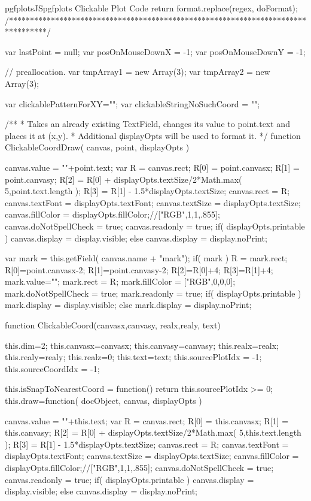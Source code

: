 {{\begin{insDLJS}[processAnnotatedPlot]{pgfplotsJS}{pgfplots Clickable Plot Code}
{    return format.replace(regex, doFormat);
}
/*********************************************************************************/


var lastPoint = null;
var posOnMouseDownX = -1;
var posOnMouseDownY = -1;

// preallocation.
var tmpArray1 = new Array(3);
var tmpArray2 = new Array(3);

var clickablePatternForXY="";
var clickableStringNoSuchCoord = "";

/**
 * Takes an already existing TextField, changes its value to point.text and places it at (x,y).
 * Additional \c displayOpts will be used to format it.
 */
function ClickableCoordDraw( canvas, point, displayOpts )
{
	canvas.value = ""+point.text;
	var R = canvas.rect;
	R[0] = point.canvasx;
	R[1] = point.canvasy;
	R[2] = R[0] + displayOpts.textSize/2*Math.max( 5,point.text.length );
	R[3] = R[1] - 1.5*displayOpts.textSize;
	canvas.rect = R;
	canvas.textFont = displayOpts.textFont;
	canvas.textSize = displayOpts.textSize;
	canvas.fillColor = displayOpts.fillColor;//["RGB",1,1,.855];
	canvas.doNotSpellCheck = true;
	canvas.readonly = true;
	if( displayOpts.printable )
		canvas.display = display.visible;
	else
		canvas.display = display.noPrint;
	
	var mark = this.getField( canvas.name + "mark");
	if( mark ) {
		R = mark.rect;
		R[0]=point.canvasx-2;
		R[1]=point.canvasy-2;
		R[2]=R[0]+4;
		R[3]=R[1]+4;
		mark.value="";
		mark.rect = R;
		mark.fillColor = ["RGB",0,0,0];
		mark.doNotSpellCheck = true;
		mark.readonly = true;
		if( displayOpts.printable )
			mark.display = display.visible;
		else
			mark.display = display.noPrint;
	}
}

function ClickableCoord(canvasx,canvasy, realx,realy, text)
{
	this.dim=2;
	this.canvasx=canvasx;
	this.canvasy=canvasy;
	this.realx=realx;
	this.realy=realy;
	this.realz=0;
	this.text=text;
	this.sourcePlotIdx = -1;
	this.sourceCoordIdx = -1;

	this.isSnapToNearestCoord = function() {
		return this.sourcePlotIdx >= 0;
	}
	this.draw=function( docObject, canvas, displayOpts )
	{
		canvas.value = ""+this.text;
		var R = canvas.rect;
		R[0] = this.canvasx;
		R[1] = this.canvasy;
		R[2] = R[0] + displayOpts.textSize/2*Math.max( 5,this.text.length );
		R[3] = R[1] - 1.5*displayOpts.textSize;
		canvas.rect = R;
		canvas.textFont = displayOpts.textFont;
		canvas.textSize = displayOpts.textSize;
		canvas.fillColor = displayOpts.fillColor;//["RGB",1,1,.855];
		canvas.doNotSpellCheck = true;
		canvas.readonly = true;
		if( displayOpts.printable )
			canvas.display = display.visible;
		else
			canvas.display = display.noPrint;
		
}}
\end{insDLJS}}}
